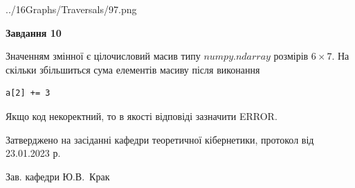 \documentclass[12pt, ukrainian]{article}
\begin{document}
{\begin {large}
\begin{center}
	{../16Graphs/Traversals/97.png}
\end{center}\par
\newpage

{\begin {center}\textbf{Завдання 10}\end {center}}\par
Значенням змінної  є цілочисловий масив типу $numpy.ndarray$ розмірів $6{\times}7$. На скільки збільшиться сума елементів масиву  після виконання
\begin{verbatim}
a[2] += 3
\end{verbatim}


Якщо код некоректний, то в якості відповіді зазначити ERROR.\par
\newpage


\end {large}
}
{\smallskip \begin {small} Затверджено на засіданні кафедри теоретичної кібернетики, протокол  від   23.01.2023 р.\par\smallskip\smallskip
{\parbox {6.5 cm}{Зав. кафедри \dotfill Ю.В.~Крак}} \end{small}}
\end{document}
